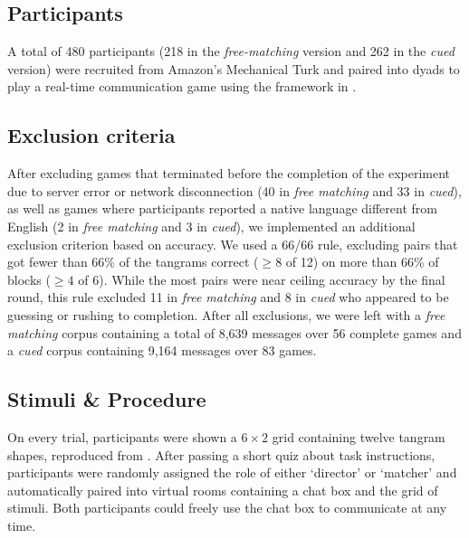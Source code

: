 \documentclass[alpha-refs]{wiley-article}
\begin{document}
\subsection{Participants}\label{participants}

A total of 480 participants (218 in the \emph{free-matching} version and 262 in the \emph{cued} version) were recruited from Amazon's Mechanical Turk and paired into dyads to play a real-time communication game using the framework in \cite{Hawkins15_RealTimeWebExperiments}. 

\subsection{Exclusion criteria}

After excluding games that terminated before the completion of the experiment due to server error or network disconnection (40 in \emph{free matching} and 33 in \emph{cued}), as well as games where participants reported a native language different from English (2 in \emph{free matching} and 3 in \emph{cued}), we implemented an additional exclusion criterion based on accuracy. 
We used a 66/66 rule, excluding pairs that got fewer than 66\% of the tangrams correct ($\ge8$ of 12) on more than 66\% of blocks ($\ge4$ of 6). 
While the most pairs were near ceiling accuracy by the final round, this rule excluded 11 in \emph{free matching} and 8 in \emph{cued} who appeared to be guessing or rushing to completion. 
After all exclusions, we were left with a \emph{free matching} corpus containing a total of 8,639 messages over 56 complete games and a \emph{cued} corpus containing 9,164 messages over 83 games.

\subsection{Stimuli \& Procedure}\label{stimuli}

On every trial, participants were shown a \(6 \times 2\) grid containing twelve tangram shapes, reproduced from \cite{ClarkWilkesGibbs86_ReferringCollaborative}.  
After passing a short quiz about task instructions, participants were randomly assigned the role of either `director' or `matcher' and automatically paired into virtual rooms containing a chat box and the grid of stimuli. 
Both participants could freely use the chat box to communicate at any time. 
\end{document}
